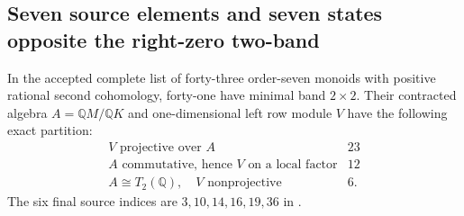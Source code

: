 \subsection{Seven source elements and seven states opposite the right-zero two-band}

\begin{lemma}
\label{C:seven-graph-source-algebras}
In the accepted complete list of forty-three order-seven
monoids with positive rational second cohomology, forty-one
have minimal band $2\times2$.  Their contracted algebra
$A=\mathbb QM/\mathbb QK$ and one-dimensional left row
module $V$ have the following exact partition:
\[
\begin{array}{c|r}
V\text{ projective over }A&23\\
A\text{ commutative, hence }V\text{ on a local factor}&12\\
A\cong T_2(\mathbb Q),\quad V\text{ nonprojective}&6.
\end{array}
\]
The six final source indices are $3,10,14,16,19,36$ in
.
\end{lemma}
